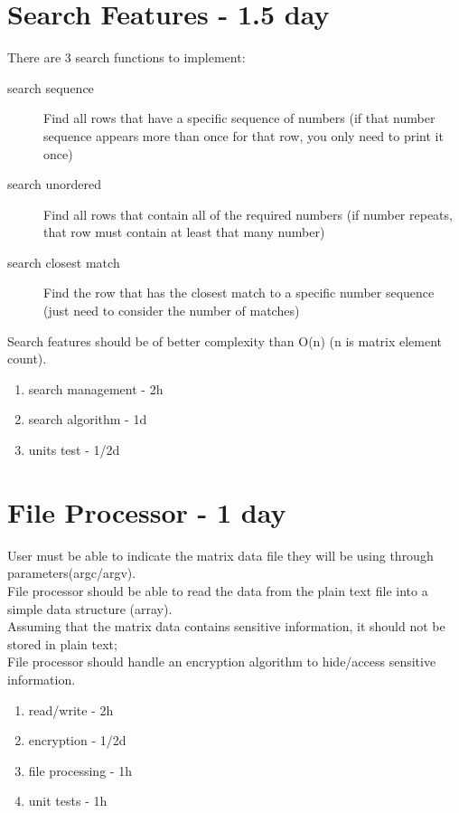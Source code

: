\section{Search Features - 1.5 day}
There are 3 search functions to implement:
\begin{description}
    \item [search sequence] Find all rows that have a specific sequence of numbers (if that number sequence
appears more than once for that row, you only need to print it once)
    \item [search unordered] Find all rows that contain all of the required numbers (if number repeats, that row must
contain at least that many number)
    \item [search closest match] Find the row that has the closest match to a specific number sequence (just need to
consider the number of matches)
\end{description}
Search features should be of better complexity than O(n) (n is matrix element count).\\

\begin{enumerate}
    \item search management - 2h
    \item search algorithm - 1d
    \item units test - 1/2d
\end{enumerate}

\section{File Processor - 1 day}
User must be able to indicate the matrix data file they will be using through parameters(argc/argv).\\
File processor should be able to read the data from the plain text file into a simple data structure (array).\\
Assuming that the matrix data contains sensitive information, it should not be stored in plain text;\\
File processor should handle an encryption algorithm to hide/access sensitive information.\\
\begin{enumerate}
    \item read/write - 2h
    \item encryption - 1/2d
    \item file processing - 1h
    \item unit tests - 1h
\end{enumerate}
